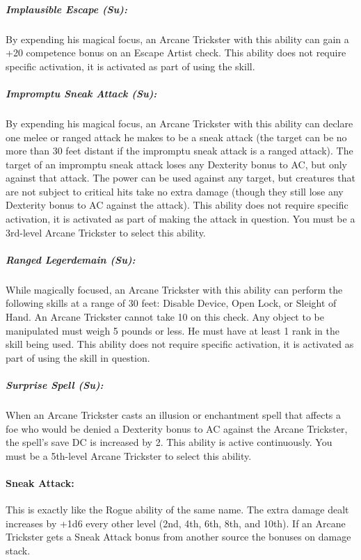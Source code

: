 \subparagraph{Implausible Escape (Su):} By expending his magical focus, an Arcane Trickster with this ability can gain a +20 competence bonus on an Escape Artist check.
This ability does not require specific activation, it is activated as part of using the skill.

\subparagraph{Impromptu Sneak Attack (Su):} By expending his magical focus, an Arcane Trickster with this ability can declare one melee or ranged attack he makes to be a sneak attack (the target can be no more than 30 feet distant if the impromptu sneak attack is a ranged attack). The target of an impromptu sneak attack loses any Dexterity bonus to AC, but only against that attack. The power can be used against any target, but creatures that are not subject to critical hits take no extra damage (though they still lose any Dexterity bonus to AC against the attack). This ability does not require specific activation, it is activated as part of making the attack in question.
You must be a 3rd-level Arcane Trickster to select this ability.

\subparagraph{Ranged Legerdemain (Su):} While magically focused, an Arcane Trickster with this ability can perform the following skills at a range of 30 feet: Disable Device, Open Lock, or Sleight of Hand. An Arcane Trickster cannot take 10 on this check. Any object to be manipulated must weigh 5 pounds or less. He must have at least 1 rank in the skill being used.
This ability does not require specific activation, it is activated as part of using the skill in question.

\subparagraph{Surprise Spell (Su):} When an Arcane Trickster casts an illusion or enchantment spell that affects a foe who would be denied a Dexterity bonus to AC against the Arcane Trickster, the spell's save DC is increased by 2.
This ability is active continuously.
You must be a 5th-level Arcane Trickster to select this ability.

\paragraph{Sneak Attack:}
This is exactly like the Rogue ability of the same name. 
The extra damage dealt increases by +1d6 every other level (2nd, 4th, 6th, 8th, and 10th). 
If an Arcane Trickster gets a Sneak Attack bonus from another source the bonuses on damage stack.